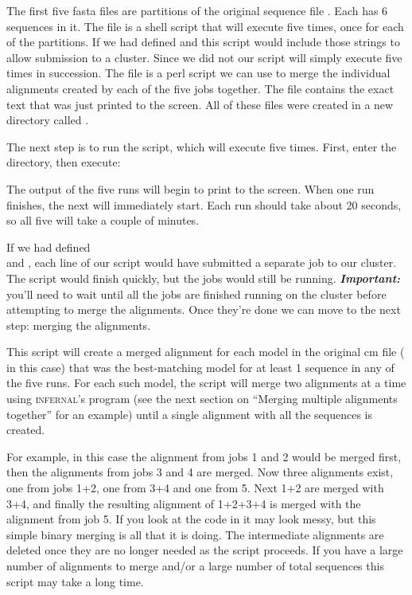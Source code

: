 The first five fasta files are partitions of the original sequence
file . Each has 6 sequences in it. The file
 is a shell script that will execute
 five times, once for each of the partitions. 
If we had defined  and
 this script would include those strings to
allow submission to a cluster. Since we did not our script will simply
execute  five times in succession. The file
 is a perl script we can use to merge the
individual alignments created by each of the five jobs together.
The  file contains the exact text that was just
printed to the screen. All of these files were created in a new
directory called .

The next step is to run the  script, which will
execute  five times. First, enter the
 directory, then execute:


The output of the five  runs will begin to print to
the screen. When one run finishes, the next will immediately
start. Each run should take about 20 seconds, so all five will take a
couple of minutes. 

If we had defined \\  and
, each line of our script would have submitted
a separate job to our cluster. The script would finish quickly, but
the jobs would still be running. \textbf{\emph{Important: }} you'll
need to wait until all the jobs are finished running on the
cluster before attempting to merge the alignments.
Once they're done we can move to the next step: merging
the alignments. 


This script will create a merged alignment for each model in the
original cm file ( in this case) that was the
best-matching model for at least 1 sequence in any of the five runs.
For each such model, the script will merge two alignments at a time
using \textsc{infernal}'s  program (see the next section
on ``Merging multiple alignments together'' for an example)
until a single alignment with all the sequences is created. 

For example, in this case the alignment from jobs 1 and 2 would be
merged first, then the alignments from jobs 3 and 4 are merged. Now
three alignments exist, one from jobs 1+2, one from 3+4 and one from
5. Next 1+2 are merged with 3+4, and finally the resulting alignment
of 1+2+3+4 is merged with the alignment from job 5. If you look at the
code in  it may look messy, but this
simple binary merging is all that it is doing. The intermediate
alignments are deleted once they are no longer needed as the script
proceeds. If you have a large number of alignments to merge and/or a
large number of total sequences this script may take a long time. 

